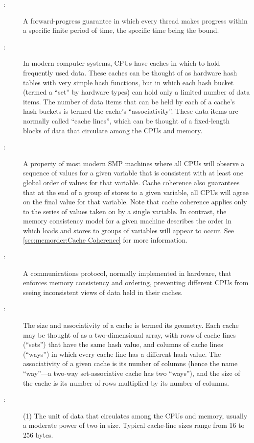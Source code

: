 \begin{description}
\item[:]
	A forward-progress guarantee in which every thread makes
	progress within a specific finite period of time, the specific
	time being the bound.
\item[:]
	In modern computer systems, CPUs have caches in which to hold
	frequently used data.
	These caches can be thought of as hardware hash tables with very
	simple hash functions,
	but in which each hash bucket (termed a ``set'' by hardware types)
	can hold only a limited number of data items.
	The number of data items that can be held by each of a cache's hash
	buckets is termed the cache's ``associativity''.
	These data items are normally called ``cache lines'', which
	can be thought of a fixed-length blocks of data that circulate
	among the CPUs and memory.
\item[:]
	A property of most modern SMP machines where all CPUs will
	observe a sequence of values for a given variable that is
	consistent with at least one global order of values for
	that variable.
	Cache coherence also guarantees that at the end of a group
	of stores to a given variable, all CPUs will agree
	on the final value for that variable.
	Note that cache coherence applies only to the series of values
	taken on by a single variable.
	In contrast, the memory consistency model for a given machine
	describes the order in which loads and stores to groups of
	variables will appear to occur.
	See \cref{sec:memorder:Cache Coherence}
	for more information.
\item[:]
	A communications protocol, normally implemented in hardware,
	that enforces memory consistency and ordering, preventing
	different CPUs from seeing inconsistent views of data held
	in their caches.
\item[:]
	The size and associativity of a cache is termed its geometry.
	Each cache may be thought of as a two-dimensional array,
	with rows of cache lines (``sets'') that have the same hash
	value, and columns of cache lines (``ways'') in which every
	cache line has a different hash value.
	The associativity of a given cache is its number of
	columns (hence the name ``way''---a two-way set-associative
	cache has two ``ways''), and the size of the cache is its
	number of rows multiplied by its number of columns.
\item[:]
	(1) The unit of data that circulates among the CPUs and memory,
	usually a moderate power of two in size.
	Typical cache-line sizes range from 16 to 256 bytes. \\

\end{description}
